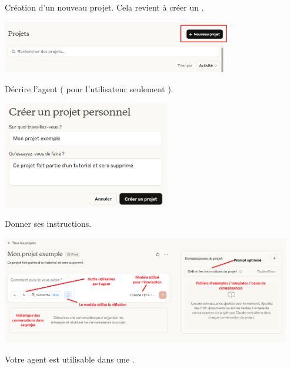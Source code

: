 \begin{Aide}
    \begin{tcbenumerate}[2]
        \tcbitem Création d'un nouveau projet. Cela revient à créer un . 

        \vspace{-0.3cm}\begin{center}\includegraphics[width=0.75\textwidth]{images/Claude_setup_projects/new-project.png}\end{center}
        \tcbitem Décrire l'agent ( pour l'utilisateur seulement ). 

        \vspace{-0.3cm}\begin{center}\includegraphics[width=0.55\textwidth]{images/Claude_setup_projects/base-setup.png}\end{center}
        \tcbitem Donner ses instructions. 

        \vspace{-0.3cm}\begin{center}\includegraphics[width=0.95\textwidth]{images/Claude_setup_projects/complete-setup.png}\end{center}

        \tcbitem Votre agent est utilisable dans une . 


\end{tcbenumerate}
\end{Aide}
